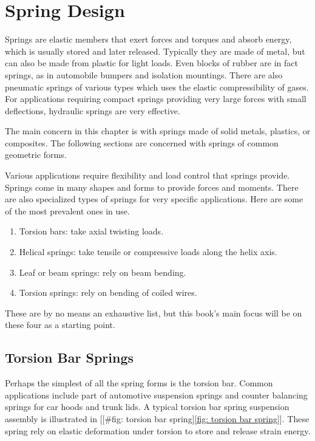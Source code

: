\documentclass[a4paper,openany,12pt]{book}
\begin{document}
{{\chapter{Spring Design}
\label{spring-design}
Springs are elastic members that exert forces and torques and absorb
energy, which is usually stored and later released. Typically they are
made of metal, but can also be made from plastic for light loads. Even
blocks of rubber are in fact springs, as in automobile bumpers and
isolation mountings. There are also pneumatic springs of various types
which uses the elastic compressibility of gases. For applications
requiring compact springs providing very large forces with small
deflections, hydraulic springs are very effective.

The main concern in this chapter is with springs made of solid metals,
plastics, or composites. The following sections are concerned with
springs of common geometric forms.

Various applications require flexibility and load control that springs
provide. Springs come in many shapes and forms to provide forces and
moments. There are also specialized types of springs for very specific
applications. Here are some of the most prevalent ones in use.

\begin{enumerate}
\item Torsion bars: take axial twisting loads.

\item Helical springs: take tensile or compressive loads along the helix
axis.

\item Leaf or beam springs: rely on beam bending.

\item Torsion springs: rely on bending of coiled wires.
\end{enumerate}

These are by no means an exhaustive list, but this book's main focus
will be on these four as a starting point.

\section{Torsion Bar Springs}
\label{torsion-bar-springs}
Perhaps the simplest of all the spring forms is the torsion bar. Common
applications include part of automotive suspension springs and counter
balancing springs for car hoods and trunk lids. A typical torsion bar
spring suspension assembly is illustrated in
[[\#fig: torsion bar spring]\ref{fig: torsion bar spring}]. These spring
rely on elastic deformation under torsion to store and release strain
energy.


}}
\end{document}
